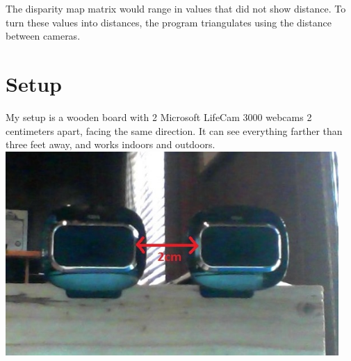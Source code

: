 \documentclass[11pt,fleqn]{article}
\begin{document}
The disparity map matrix would range in values that did not show distance. To turn these values into distances, the program triangulates using the distance between cameras.

\section{Setup}
My setup is a wooden board with 2 Microsoft LifeCam 3000 webcams 2 centimeters apart, facing the same direction. It can see everything farther than three feet away, and works indoors and outdoors.\\[2pt]

\includegraphics[width=0.95\textwidth]{images/setup.jpg}
\end{document}
